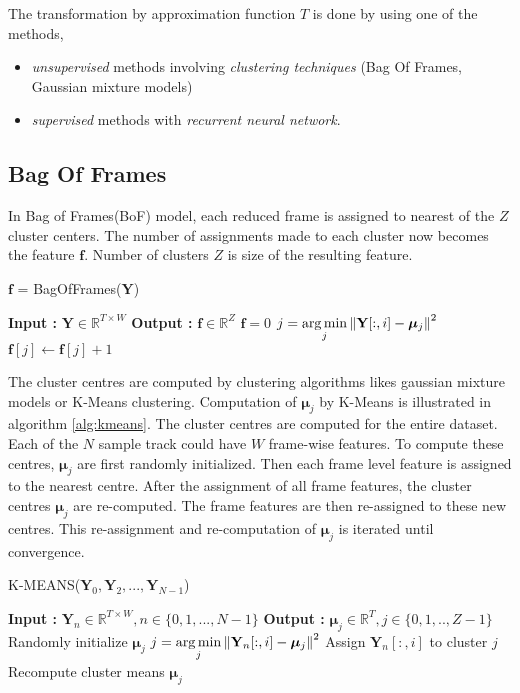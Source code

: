 \noindent The transformation by approximation function $T$ is done by using one of the methods,
\begin{itemize}
\setlength\itemsep{0em}
\item \textit{unsupervised} methods involving \textit{clustering techniques} (Bag Of Frames, Gaussian mixture models)
\item \textit{supervised} methods with \textit{recurrent neural network}. 
\end{itemize} 
 
\subsection{Bag Of Frames}
\label{clustering}
In Bag of Frames(BoF) model\cite{BoF}, each reduced frame is assigned to nearest of the $Z$ cluster centers. The number of assignments made to each cluster now becomes the feature $\textbf{f}$. Number of clusters $Z$ is size of the resulting feature.
\begin{algorithm}
  \caption{$\textbf{f}$ = BagOfFrames($\textbf{Y}$) }\label{bof}
  \begin{algorithmic}[1]
    \Statex \textbf{Input :} $\textbf{Y} \in \mathbb{R}^{T \times W}$
    \Statex \textbf{Output :} $\textbf{f} \in \mathbb{R}^{Z}$
    \State $\textbf{f} = 0$
    \State $j = \operatorname*{arg\,min}\limits_{j} \left\lVert\textbf{Y}[:,i] - \bm{\mu}_{j}\right\rVert^{2}$ 
    \State $\textbf{f}[j] \leftarrow \textbf{f}[j] + 1$
    \EndFor
  \end{algorithmic}
\end{algorithm}
\FloatBarrier
\noindent The cluster centres are computed by clustering algorithms likes gaussian mixture models or K-Means clustering. Computation of $\bm{\mu}_{j}$ by K-Means is illustrated in algorithm \ref{alg:kmeans}. The cluster centres are computed for the entire dataset. Each of the $N$ sample track could have $W$ frame-wise features. To compute these centres, $\bm{\mu}_{j}$ are first randomly initialized. Then each frame level feature is assigned to the nearest centre. After the assignment of all frame features, the cluster centres $\bm{\mu}_{j}$ are re-computed. The frame features are then re-assigned to these new centres. This re-assignment and re-computation of $\bm{\mu}_{j}$ is iterated until convergence.  
\begin{algorithm}
  \caption{K-MEANS($\textbf{Y}_{0}, \textbf{Y}_{2},..., \textbf{Y}_{N-1}$) }\label{alg:kmeans}
  \begin{algorithmic}[1]
    \Statex \textbf{Input :} $\textbf{Y}_{n} \in \mathbb{R}^{T \times W}, n \in \{0,1,...,N-1\}$
    \Statex \textbf{Output :} $\bm{\mu}_{j} \in \mathbb{R}^{T}, j \in \{0,1,..,Z-1\}$
    \State Randomly initialize $\bm{\mu}_{j}$
         \State $j = \operatorname*{arg\,min}\limits_{j} \left\lVert\textbf{Y}_{n}[:,i] - \bm{\mu}_{j}\right\rVert^{2}$
          \State Assign $\textbf{Y}_{n}[:,i]$ to cluster $j$
      \EndFor
    \EndFor
   \State Recompute cluster means $\bm{\mu}_{j}$
   \EndWhile
  \end{algorithmic}
\end{algorithm}
